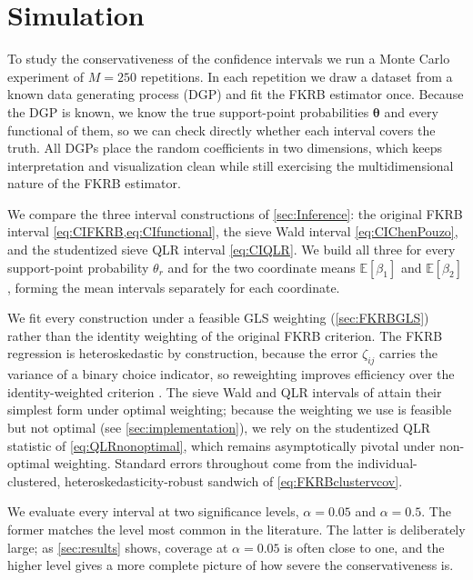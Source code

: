\section{Simulation}
\label{sec:simulation}
To study the conservativeness of the confidence intervals we run a Monte Carlo experiment of $M = 250$ repetitions.
In each repetition we draw a dataset from a known data generating process (DGP) and fit the FKRB estimator once.
Because the DGP is known, we know the true support-point probabilities $\bm{\theta}$ and every functional of them, so we can check directly whether each interval covers the truth.
All DGPs place the random coefficients in two dimensions, which keeps interpretation and visualization clean while still exercising the multidimensional nature of the FKRB estimator.

We compare the three interval constructions of \cref{sec:Inference}: the original FKRB interval \cref{eq:CIFKRB,eq:CIfunctional}, the sieve Wald interval \cref{eq:CIChenPouzo}, and the studentized sieve QLR interval \cref{eq:CIQLR}.
We build all three for every support-point probability $\theta_r$ and for the two coordinate means $\mathbb{E}[\beta_1]$ and $\mathbb{E}[\beta_2]$, forming the mean intervals separately for each coordinate.

We fit every construction under a feasible GLS weighting (\cref{sec:FKRBGLS}) rather than the identity weighting of the original FKRB criterion.
The FKRB regression is heteroskedastic by construction, because the error $\zeta_{ij}$ carries the variance of a binary choice indicator, so reweighting improves efficiency over the identity-weighted criterion \citep{Greene2019}.
The sieve Wald and QLR intervals of \citet{ChenPouzo2015} attain their simplest form under optimal weighting; because the weighting we use is feasible but not optimal (see \cref{sec:implementation}), we rely on the studentized QLR statistic of \cref{eq:QLRnonoptimal}, which remains asymptotically pivotal under non-optimal weighting.
Standard errors throughout come from the individual-clustered, heteroskedasticity-robust sandwich of \cref{eq:FKRBclustervcov}.

We evaluate every interval at two significance levels, $\alpha = 0.05$ and $\alpha = 0.5$.
The former matches the level most common in the literature.
The latter is deliberately large; as \cref{sec:results} shows, coverage at $\alpha = 0.05$ is often close to one, and the higher level gives a more complete picture of how severe the conservativeness is.

